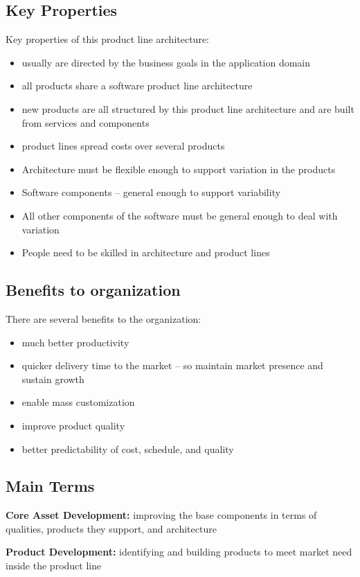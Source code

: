 \documentclass[a4paper]{article}
\begin{document}
\subsection{Key Properties}
Key properties of this product line architecture:
\begin{itemize}
\item usually are directed by the business goals in the application domain
\item all products share a software product line architecture
\item new products are all structured by this product line architecture and are built from services and components
\item product lines spread costs over several products
\item Architecture must be flexible enough to support variation in the products
\item Software components – general enough to support variability
\item All other components of the software must be general enough to deal with variation
\item People need to be skilled in architecture and product lines
\end{itemize}

\subsection{Benefits to organization}
There are several benefits to the organization:
\begin{itemize}
\item much better productivity
\item quicker delivery time to the market – so maintain market presence and sustain growth
\item enable mass customization
\item improve product quality
\item better predictability of cost, schedule, and quality
\end{itemize}

\subsection{Main Terms}
\textbf{Core Asset Development:} improving the base components in terms of qualities, products they support, and architecture

\textbf{Product Development:} identifying and building products to meet market need inside the product line
\end{document}
